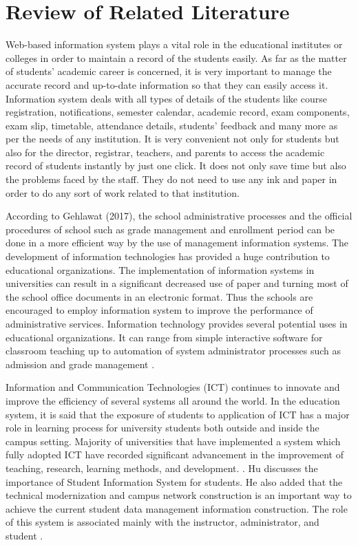 \documentclass[11pt,a4paper,titlepage]{article}
\let\stdsection\section
\renewcommand\section{\newpage\stdsection}
\begin{document}
\section{Review of Related Literature}
Web-based information system plays a vital role in the educational institutes or colleges in order to maintain a record of the students easily. As far as the matter of students’ academic career is concerned, it is very important to manage the accurate record and up-to-date information so that they can easily access it. Information system deals with all types of details of the students like course registration, notifications, semester calendar, academic record, exam components, exam slip, timetable, attendance details, students’ feedback and many more as per the needs of any institution. It is very convenient not only for students but also for the director, registrar, teachers, and parents to access the academic record of students instantly by just one click. It does not only save time but also the problems faced by the staff. They do not need to use any ink and paper in order to do any sort of work related to that institution. 

According to Gehlawat (2017), the school administrative processes and the official procedures of school such as grade management and enrollment period can be done in a more efficient way by the use of management information systems. The development of information technologies has provided a huge contribution to educational organizations. The implementation of information systems in universities can result in a significant decreased use of paper and turning most of the school office documents in an electronic format. Thus the schools are encouraged to employ information system to improve the performance of administrative services. Information technology provides several potential uses in educational organizations. It can range from simple interactive software for classroom teaching up to automation of system administrator processes such as admission and grade management \cite{Gl}. 

Information and Communication Technologies (ICT) continues to innovate and improve the efficiency of several systems all around the world. In the education system, it is said that the exposure of students to application of ICT has a major role in learning process for university students both outside and inside the campus setting. Majority of universities that have implemented a system which fully adopted ICT have recorded significant advancement in the improvement of teaching, research, learning methods, and development.  \cite{Basri}. Hu discusses the importance of Student Information System for students. He also added that the technical modernization and campus network construction is an important way to achieve the current student data management information construction. The role of this system is associated mainly with the instructor, administrator, and student \cite{Hu}.
\end{document}
